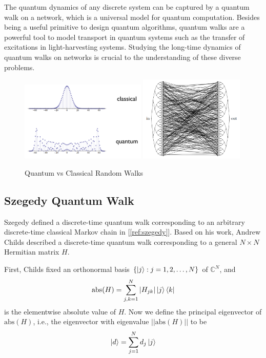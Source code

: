 \documentclass[
10pt, %
a4paper, %
oneside, %
headinclude,footinclude, %
BCOR5mm, %
]{scrartcl}
\begin{document}
The quantum dynamics of any discrete system can be captured by a quantum walk on a network, which is a universal model for quantum computation. Besides being a useful primitive to design quantum algorithms, quantum walks are a powerful tool to model transport in quantum systems such as the transfer of excitations in light-harvesting systems. Studying the long-time dynamics of quantum walks on networks is crucial to the understanding of these diverse problems.

\begin{figure}[H]
    \centering
    \includegraphics[width=60mm]{images/walks.png}
    \includegraphics[width=50mm]{images/walks2.png}
    \caption{Quantum vs Classical Random Walks}
\end{figure}

\subsection{Szegedy Quantum Walk}
Szegedy defined a discrete-time quantum walk corresponding to an arbitrary discrete-time classical Markov chain in [\ref{ref:szegedy}]. Based on his work, Andrew Childs described a discrete-time quantum walk corresponding to a general $N\times N$ Hermitian matrix $H$.\newline

First, Childs fixed an orthonormal basis $\{\ket j:j=1,2,\ldots,N\}$ of $\mathbb{C}^N$, and
$$\text{abs}(H)=\sum_{j,k=1}^N\abs{H_{jk}}\ket j\bra k$$
is the elementwise absolute value of $H$. Now we define the principal eigenvector of $\text{abs}(H)$, i.e., the eigenvector with eigenvalue $||\text{abs}(H)||$ to be
$$\ket d=\sum_{j=1}^Nd_j\ket j$$
\end{document}
